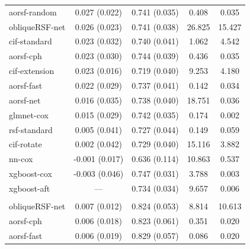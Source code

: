 \documentclass[twoside,11pt]{article}\usepackage[]{graphicx}\usepackage[]{xcolor}
\newenvironment{knitrout}{}{} %
\begin{document}
\begin{knitrout}
\begin{longtable}[t]{lcccc}
\hspace{1em}aorsf-random & 0.027 (0.022) & 0.741 (0.035) & 0.408 & 0.035\\
\hspace{1em}obliqueRSF-net & 0.026 (0.023) & 0.741 (0.038) & 26.825 & 15.427\\
\hspace{1em}cif-standard & 0.023 (0.032) & 0.740 (0.041) & 1.062 & 4.542\\
\hspace{1em}aorsf-cph & 0.023 (0.030) & 0.744 (0.039) & 0.436 & 0.035\\
\hspace{1em}cif-extension & 0.023 (0.016) & 0.719 (0.040) & 9.253 & 4.180\\
\hspace{1em}aorsf-fast & 0.022 (0.029) & 0.737 (0.041) & 0.142 & 0.034\\
\hspace{1em}aorsf-net & 0.016 (0.035) & 0.738 (0.040) & 18.751 & 0.036\\
\hspace{1em}glmnet-cox & 0.015 (0.029) & 0.742 (0.035) & 0.174 & 0.002\\
\hspace{1em}rsf-standard & 0.005 (0.041) & 0.727 (0.044) & 0.149 & 0.059\\
\hspace{1em}cif-rotate & 0.002 (0.042) & 0.729 (0.040) & 15.116 & 3.882\\
\hspace{1em}nn-cox & -0.001 (0.017) & 0.636 (0.114) & 10.863 & 0.537\\
\hspace{1em}xgboost-cox & -0.003 (0.046) & 0.747 (0.031) & 3.788 & 0.003\\
\hspace{1em}xgboost-aft & --- & 0.734 (0.034) & 9.657 & 0.006\\
\addlinespace[0.3em]
\multicolumn{5}{l}{\textit{\textbf{ACTG 320; death, n = 1151, p = 12}}}\\
\hline
\hspace{1em}obliqueRSF-net & 0.007 (0.012) & 0.824 (0.053) & 8.814 & 10.613\\
\hspace{1em}aorsf-cph & 0.006 (0.018) & 0.823 (0.061) & 0.351 & 0.020\\
\hspace{1em}aorsf-fast & 0.006 (0.019) & 0.829 (0.057) & 0.086 & 0.020\\

\end{longtable}
\end{knitrout}
\end{document}
